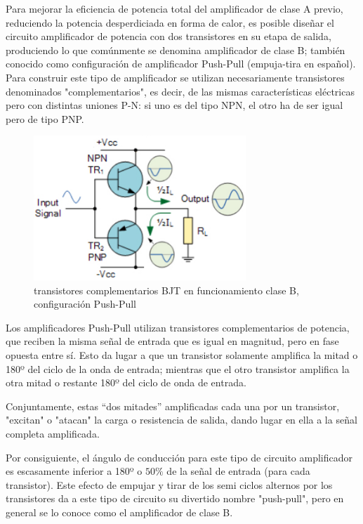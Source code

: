 Para mejorar la eficiencia de potencia total del amplificador de clase A previo, reduciendo la potencia desperdiciada en forma de calor, es posible diseñar el circuito amplificador de potencia con dos transistores en su etapa de salida, produciendo lo que comúnmente se denomina amplificador de clase B; también conocido como configuración de amplificador Push-Pull (empuja-tira en español). Para construir este tipo de amplificador se utilizan necesariamente transistores denominados "complementarios", es decir, de las mismas características eléctricas pero con distintas uniones P-N: si uno es del tipo NPN, el otro ha de ser igual pero de tipo PNP.

\begin{figure}[H]
    \centering
    \includegraphics[width=8cm]{Imagenes/clase_b.png}
    \caption{transistores complementarios BJT en funcionamiento clase B, configuración Push-Pull}
    \label{fig:clase_b}
\end{figure}


Los amplificadores Push-Pull utilizan transistores complementarios de potencia, que reciben la misma señal de entrada que es igual en magnitud, pero en fase opuesta entre sí. Esto da lugar a que un transistor solamente amplifica la mitad o 180º del ciclo de la onda de entrada; mientras que el otro transistor amplifica la otra mitad o restante 180º del ciclo de onda de entrada.

Conjuntamente, estas “dos mitades” amplificadas cada una por un transistor, "excitan" o "atacan" la carga o resistencia de salida, dando lugar en ella a la señal completa amplificada.

Por consiguiente, el ángulo de conducción para este tipo de circuito amplificador es escasamente inferior a 180º o $50\%$ de la señal de entrada (para cada transistor). Este efecto de empujar y tirar de los semi ciclos alternos por los transistores da a este tipo de circuito su divertido nombre "push-pull", pero en general se lo conoce como el amplificador de clase B.

